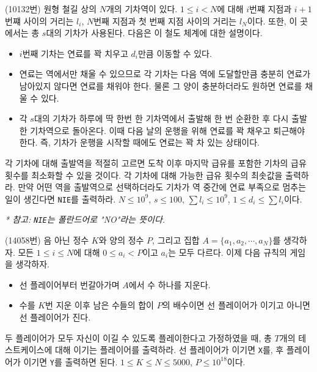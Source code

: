\begin{problem}
    (10132번) 원형 철길 상의 $N$개의 기차역이 있다. $1 \leq i < N$에 대해 $i$번쨰 지점과 $i+1$번쨰 사이의 거리는 $l_i$, $N$번째 지점과 첫 번째 지점 사이의 거리는 $l_N$이다. 또한, 이 곳에서는 총 $s$대의 기차가 사용된다. 다음은 이 철도 체계에 대한 설명이다.
    \begin{itemize}
        \item $i$번째 기차는 연료를 꽉 치우고 $d_i$만큼 이동할 수 있다. 
        \item 연료는 역에서만 채울 수 있으므로 각 기차는 다음 역에 도달할만큼 충분히 연료가 남아있지 않다면 연료를 채워야 한다. 물론 그 양이 충분하더라도 원하면 연료를 채울 수 있다. 
        \item 각 $s$대의 기차가 하루에 딱 한번 한 기차역에서 출발해 한 번 순환한 후 다시 출발한 기차역으로 돌아온다. 이때 다음 날의 운행을 위해 연료를 꽉 채우고 퇴근해야 한다. 즉, 기차가 운행을 시작할 때에도 연료는 꽉 차 있는 상태이다.
    \end{itemize}
    각 기차에 대해 출발역을 적절히 고르면 도착 이후 마지막 급유를 포함한 기차의 급유 횟수를 최소화할 수 있을 것이다. 각 기차에 대해 가능한 급유 횟수의 최솟값을 출력하라. 만약 어떤 역을 출발역으로 선택하더라도 기차가 역 중간에 연료 부족으로 멈추는 일이 생긴다면 \texttt{NIE}를 출력하라. $N \leq 10^9$, $s \leq 100$, $\sum l_i \leq 10^9$, $1 \leq d_i \leq \sum l_i$이다.
    
    \textit{* 참고: \texttt{NIE}는 폴란드어로 "NO"라는 뜻이다.}
\end{problem}

\begin{problem}
    (14058번) 음 아닌 정수 $K$와 양의 정수 $P$, 그리고 집합 $A = \{a_1, a_2, \cdots, a_N\}$를 생각하자. 모든 $1 \leq i \leq N$에 대해 $0 \leq a_i < P$이고 $a_i$는 모두 다르다. 이제 다음 규칙의 게임을 생각하자.
    \begin{itemize}
        \item 선 플레이어부터 번갈아가며 $A$에서 수 하나를 지운다.
        \item 수를 $K$번 지운 이후 남은 수들의 합이 $P$의 배수이면 선 플레이어가 이기고 아니면 선 플레이어가 진다.
    \end{itemize}
    두 플레이어가 모두 자신이 이길 수 있도록 플레이한다고 가정하였을 때, 총 $T$개의 테스트케이스에 대해 이기는 플레이어를 출력하라. 선 플레이어가 이기면 \texttt{X}를, 후 플레이어가 이기면 \texttt{Y}를 출력하면 된다. $1 \leq K \leq N \leq 5000$, $P \leq 10^{18}$이다.
\end{problem}

